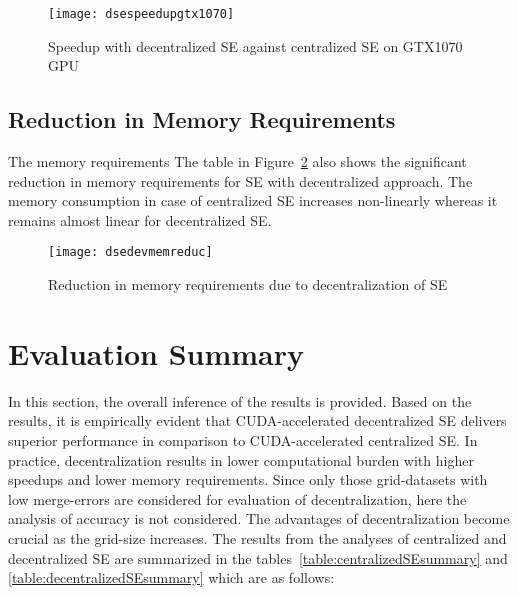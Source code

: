 \documentclass[thesis.tex]{subfiles}
\begin{document}
\begin{figure}[H]
	\centering
	\texttt{[image: dsespeedupgtx1070]}
	\caption{Speedup with decentralized SE against centralized SE on GTX1070 GPU}
	\label{fig:dsespeedupgtx1070}
\end{figure}

\subsection{Reduction in Memory Requirements}
The memory requirements The table in Figure~\ref{fig:dsedevmemreduc} also shows the significant reduction in memory requirements for SE with decentralized approach. The memory consumption in case of centralized SE increases non-linearly whereas it remains almost linear for decentralized SE.
\begin{figure}[H]
	\centering
	\texttt{[image: dsedevmemreduc]}
	\caption{Reduction in memory requirements due to decentralization of SE}
	\label{fig:dsedevmemreduc}
\end{figure}


\section{Evaluation Summary}
In this section, the overall inference of the results is provided. Based on the results, it is empirically evident that CUDA-accelerated decentralized SE delivers superior performance in comparison to CUDA-accelerated centralized SE. In practice, decentralization results in lower computational burden with higher speedups and lower memory requirements. Since only those grid-datasets with low merge-errors are considered for evaluation of decentralization, here the analysis of accuracy is not considered. The advantages of decentralization become crucial as the grid-size increases. The results from the analyses of centralized and decentralized SE are summarized in the tables~\ref{table:centralizedSEsummary} and \ref{table:decentralizedSEsummary} which are as follows:
\end{document}
